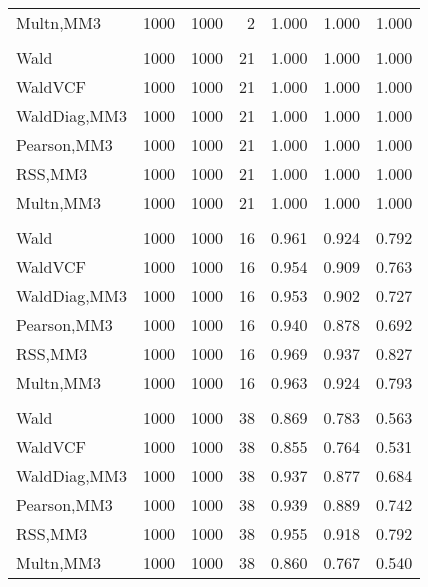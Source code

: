 \documentclass[
]{article}
\begin{document}
\begin{table}[H]
{\begin{tabular}[t]{lrrrrrr}
\hspace{1em}Multn,MM3 & 1000 & 1000 & 2 & 1.000 & 1.000 & 1.000\\
\addlinespace[0.3em]
\multicolumn{7}{l}{\textbf{1F 15V}}\\
\hspace{1em}Wald & 1000 & 1000 & 21 & 1.000 & 1.000 & 1.000\\
\hspace{1em}WaldVCF & 1000 & 1000 & 21 & 1.000 & 1.000 & 1.000\\
\hspace{1em}WaldDiag,MM3 & 1000 & 1000 & 21 & 1.000 & 1.000 & 1.000\\
\hspace{1em}Pearson,MM3 & 1000 & 1000 & 21 & 1.000 & 1.000 & 1.000\\
\hspace{1em}RSS,MM3 & 1000 & 1000 & 21 & 1.000 & 1.000 & 1.000\\
\hspace{1em}Multn,MM3 & 1000 & 1000 & 21 & 1.000 & 1.000 & 1.000\\
\addlinespace[0.3em]
\multicolumn{7}{l}{\textbf{2F 10V}}\\
\hspace{1em}Wald & 1000 & 1000 & 16 & 0.961 & 0.924 & 0.792\\
\hspace{1em}WaldVCF & 1000 & 1000 & 16 & 0.954 & 0.909 & 0.763\\
\hspace{1em}WaldDiag,MM3 & 1000 & 1000 & 16 & 0.953 & 0.902 & 0.727\\
\hspace{1em}Pearson,MM3 & 1000 & 1000 & 16 & 0.940 & 0.878 & 0.692\\
\hspace{1em}RSS,MM3 & 1000 & 1000 & 16 & 0.969 & 0.937 & 0.827\\
\hspace{1em}Multn,MM3 & 1000 & 1000 & 16 & 0.963 & 0.924 & 0.793\\
\addlinespace[0.3em]
\multicolumn{7}{l}{\textbf{3F 15V}}\\
\hspace{1em}Wald & 1000 & 1000 & 38 & 0.869 & 0.783 & 0.563\\
\hspace{1em}WaldVCF & 1000 & 1000 & 38 & 0.855 & 0.764 & 0.531\\
\hspace{1em}WaldDiag,MM3 & 1000 & 1000 & 38 & 0.937 & 0.877 & 0.684\\
\hspace{1em}Pearson,MM3 & 1000 & 1000 & 38 & 0.939 & 0.889 & 0.742\\
\hspace{1em}RSS,MM3 & 1000 & 1000 & 38 & 0.955 & 0.918 & 0.792\\
\hspace{1em}Multn,MM3 & 1000 & 1000 & 38 & 0.860 & 0.767 & 0.540\\
\bottomrule
\end{tabular}}
\endgroup{}
\end{table}
\end{document}
